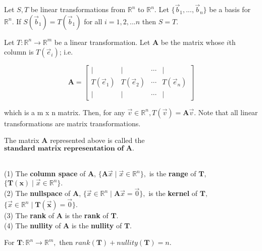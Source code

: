 \documentclass{article}
\begin{document}
\begin{corollary}
Let $S, T$ be linear transformations from $\mathbb{R}^n$ to $\mathbb{R}^n.$ Let $\{\vec{b}_{1}, ... , \vec{b}_{n}\}$ be a basis for $\mathbb{R}^n.$ If $S(\vec{b}_{1}) = T(\vec{b}_{1})$ for all $i = 1, 2, ... n$ then $S = T.$
\end{corollary}

\begin{corollary}
Let $T: \mathbb{R}^n \rightarrow \mathbb{R}^m$ be a linear transformation. Let $\boldsymbol{A}$ be the matrix whose $i$th column is $T(\vec{e}_{i})$; i.e.

\[
\boldsymbol{A} =
  \begin{bmatrix}
    | & | & \cdots & | \\
    T(\vec{e}_{1}) & T(\vec{e}_{2}) & \cdots & T(\vec{e}_{n}) \\
    | & | & \cdots & | 
  \end{bmatrix} 
\]

which is a m x n matrix. Then, for any $\vec{v} \in \mathbb{R}^n, T(\vec{v}) = \boldsymbol{A}\vec{v}.$ Note that all linear transformations are matrix transformations.
\end{corollary}

The matrix $\boldsymbol{A}$ represented above is called the $\textbf{standard matrix representation of $\boldsymbol{A}$}.$

\begin{definition} \leavevmode \\
(1) The \textbf{column space} of $\boldsymbol{A}$, $\{\boldsymbol{A}\vec{x} \mid \vec{x} \in \mathbb{R}^n \},$ is the \textbf{range} of $\boldsymbol{T}$, $\{\boldsymbol{T(x)} \mid \vec{x} \in \mathbb{R}^n \}.$ \\
(2) The \textbf{nullspace} of $\boldsymbol{A}$, $\{\vec{x} \in \mathbb{R}^n \mid \boldsymbol{A}\vec{x} = \vec{0}\},$ is the \textbf{kernel} of $\boldsymbol{T},$ $\{\vec{x} \in \mathbb{R}^n \mid \boldsymbol{T(\vec{x})} = \vec{0}\}.$ \\
(3) The \textbf{rank} of $\boldsymbol{A}$ is the \textbf{rank} of $\boldsymbol{T}.$ \\
(4) The \textbf{nullity} of $\boldsymbol{A}$ is the \textbf{nullity} of $\boldsymbol{T}.$ \\
\end{definition}

\begin{theorem} For $\boldsymbol{T}: \mathbb{R}^n \rightarrow \mathbb{R}^m,$ then $rank(\boldsymbol{T}) + nullity(\boldsymbol{T}) = n.$ 

\end{theorem}\newpage
\end{document}
